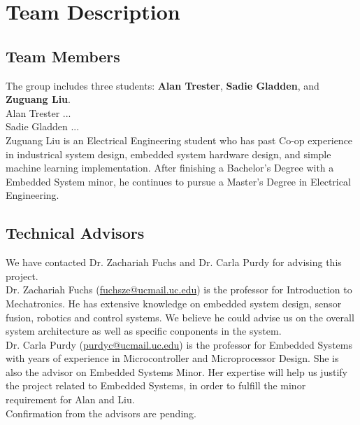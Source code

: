 \chapter{Team Description}

\section{Team Members}
	The group includes three students: \textbf{Alan Trester}, \textbf{Sadie Gladden}, and \textbf{Zuguang Liu}. \\
	
	Alan Trester ... \\
	
	Sadie Gladden ... \\
	
	Zuguang Liu is an Electrical Engineering student who has past Co-op experience in industrical system design, embedded system hardware design, and simple machine learning implementation. After finishing a Bachelor's Degree with a Embedded System minor, he continues to pursue a Master's Degree in Electrical Engineering. 
	
\section{Technical Advisors} 

	We have contacted Dr. Zachariah Fuchs and Dr. Carla Purdy for advising this project. \\
	
	Dr. Zachariah Fuchs (\href{fuchsze@ucmail.uc.edu}{fuchsze@ucmail.uc.edu}) is the professor for Introduction to Mechatronics. He has extensive knowledge on embedded system design, sensor fusion, robotics and control systems. We believe he could advise us on the overall system architecture as well as specific conponents in the system. \\
	
	Dr. Carla Purdy (\href{purdyc@ucmail.uc.edu}{purdyc@ucmail.uc.edu}) is the professor for Embedded Systems with years of experience in Microcontroller and Microprocessor Design. She is also the advisor on Embedded Systems Minor. Her expertise will help us justify the project related to Embedded Systems, in order to fulfill the minor requirement for Alan and Liu. \\

	Confirmation from the advisors are pending.
	